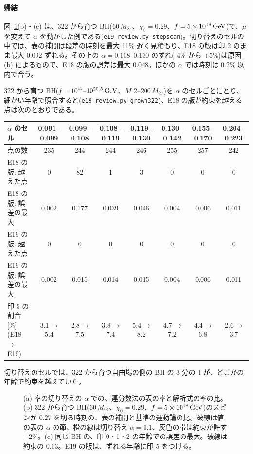 \paragraph{帰結}
図~\ref{fig:e19}(b)・(c) は、322 から育つ BH($60\,M_\odot$、$\chi_0=0.29$、$f=5\times10^{18}\,\mathrm{GeV}$)で、$\mu$ を変えて $\alpha$ を動かした例である(\texttt{e19\_review.py stepscan})。切り替えのセルの中では、表の補間は段差の時刻を最大 11\% 遅く見積もり、E18 の版は印 2 のまま最大 0.092 ずれる。その上の $\alpha=0.108$--0.130 のずれ(-4\% から +5\%)は原因 (b) によるもので、E18 の版の誤差は最大 0.048。ほかの $\alpha$ では時刻は 0.2\% 以内で合う。

322 から育つ BH($f=10^{15}$--$10^{20.5}\,\mathrm{GeV}$、$M$ 2--200$\,M_\odot$)を $\alpha$ のセルごとにとり、細かい年齢で照合すると(\texttt{e19\_review.py grown322})、E18 の版が約束を越える点は次のとおりである。
\begin{center}\footnotesize\setlength{\tabcolsep}{3.5pt}
\begin{tabular}{lccccccc}
\toprule
$\alpha$ のセル & 0.091--0.099 & 0.099--0.108 & 0.108--0.119 & 0.119--0.130 & 0.130--0.142 & 0.155--0.170 & 0.204--0.223\\
\midrule
点の数 & 235 & 244 & 244 & 246 & 255 & 257 & 242\\
E18 の版: 越えた点 & 0 & 82 & 1 & 3 & 0 & 0 & 0\\
E18 の版: 誤差の最大 & 0.002 & 0.177 & 0.039 & 0.046 & 0.004 & 0.006 & 0.011\\
E19 の版: 越えた点 & 0 & 0 & 0 & 0 & 0 & 0 & 0\\
E19 の版: 誤差の最大 & 0.002 & 0.015 & 0.014 & 0.015 & 0.004 & 0.006 & 0.011\\
印 5 の割合 [\%](E18 → E19) & 3.1 → 5.4 & 2.8 → 7.5 & 3.8 → 7.4 & 5.4 → 8.2 & 4.7 → 7.2 & 4.4 → 6.8 & 2.6 → 3.7\\
\bottomrule
\end{tabular}
\end{center}
切り替えのセルでは、322 から育つ自由場の側の BH の 3 分の 1 が、どこかの年齢で約束を越えていた。

\begin{figure}[H]
\centering

\caption{(a) 率の切り替えの $\alpha$ での、連分数法の表の率と解析式の率の比。(b) 322 から育つ BH($60\,M_\odot$、$\chi_0=0.29$、$f=5\times10^{18}\,\mathrm{GeV}$)のスピンが 0.27 を切る時刻の、表の補間と基準の運動論の比。破線は値の表の $\alpha$ の節、橙の線は切り替え $\alpha=0.1$、灰色の帯は約束が許す $\pm2\%$。(c) 同じ BH の、印 0・1・2 の年齢での誤差の最大。破線は約束の 0.03。E19 の版は、ずれる年齢に印 5 をつける。}
\label{fig:e19}
\end{figure}

